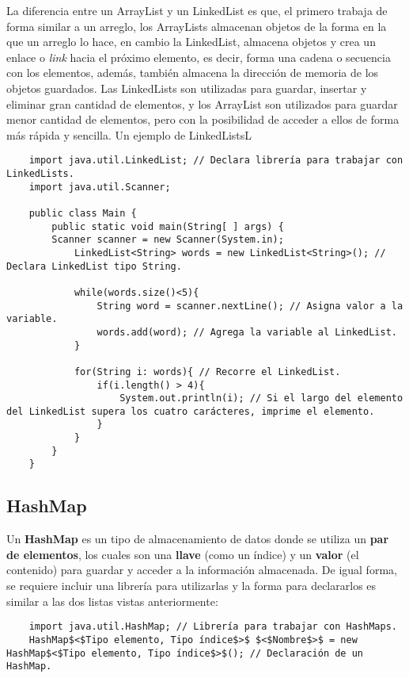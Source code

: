 La diferencia entre un ArrayList y un LinkedList es que, el primero trabaja de forma similar a un arreglo, los ArrayLists almacenan objetos de la forma en la que un arreglo lo hace, en cambio la LinkedList, almacena objetos y crea un enlace o \textit{link} hacia el próximo elemento, es decir, forma una cadena o secuencia con los elementos, además, también almacena la dirección de memoria de los objetos guardados. Las LinkedLists son utilizadas para guardar, insertar y eliminar gran cantidad de elementos, y los ArrayList son utilizados para guardar menor cantidad de elementos, pero con la posibilidad de acceder a ellos de forma más rápida y sencilla. Un ejemplo de LinkedListsL
\begin{lstlisting}
    import java.util.LinkedList; // Declara librería para trabajar con LinkedLists.
    import java.util.Scanner;

    public class Main {
        public static void main(String[ ] args) {
	    Scanner scanner = new Scanner(System.in);
            LinkedList<String> words = new LinkedList<String>(); // Declara LinkedList tipo String.
        
            while(words.size()<5){
                String word = scanner.nextLine(); // Asigna valor a la variable.
                words.add(word); // Agrega la variable al LinkedList.
            }
        
            for(String i: words){ // Recorre el LinkedList.
                if(i.length() > 4){
                    System.out.println(i); // Si el largo del elemento del LinkedList supera los cuatro carácteres, imprime el elemento.
                }
            }
        }
    }
\end{lstlisting}


\subsection{HashMap}

Un \textbf{HashMap} es un tipo de almacenamiento de datos donde se utiliza un \textbf{par de elementos}, los cuales son una \textbf{llave} (como un índice) y un \textbf{valor} (el contenido) para guardar y acceder a la información almacenada. De igual forma, se requiere incluir una librería para utilizarlas y la forma para declararlos es similar a las dos listas vistas anteriormente:
\begin{lstlisting}
    import java.util.HashMap; // Librería para trabajar con HashMaps.
    HashMap$<$Tipo elemento, Tipo índice$>$ $<$Nombre$>$ = new HashMap$<$Tipo elemento, Tipo índice$>$(); // Declaración de un HashMap.
\end{lstlisting}

